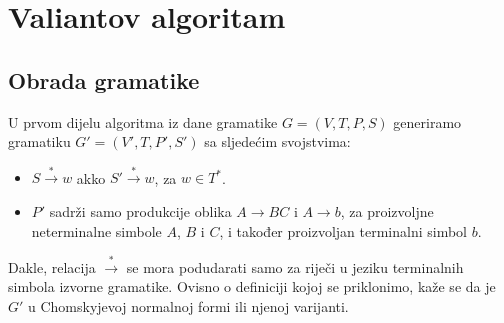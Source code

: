 \documentclass[a4paper,oneside,12pt]{article} %
\begin{document}
    
   \section{Valiantov algoritam}
   \subsection{Obrada gramatike}
    
   U prvom dijelu algoritma iz dane gramatike $G = (V, T, P, S)$ generiramo gramatiku
       $G' = (V', T, P', S')$ sa sljedećim svojstvima:
   \begin{itemize}
       \item $S \xrightarrow{*} w$ akko $S' \xrightarrow{*} w$, za $w \in T^*$.
       \item $P'$ sadrži samo produkcije oblika $A \to BC$ i $A \to b$, 
           za proizvoljne neterminalne simbole $A$, $B$ i $C$,
           i također proizvoljan terminalni simbol $b$.
    \end{itemize}
    Dakle, relacija $\xrightarrow{*}$ se mora podudarati samo za riječi
        u jeziku terminalnih simbola izvorne gramatike.
    Ovisno o definiciji kojoj se priklonimo, kaže se da je $G'$ 
        u Chomskyjevoj normalnoj formi ili njenoj varijanti.
        
\end{document}
